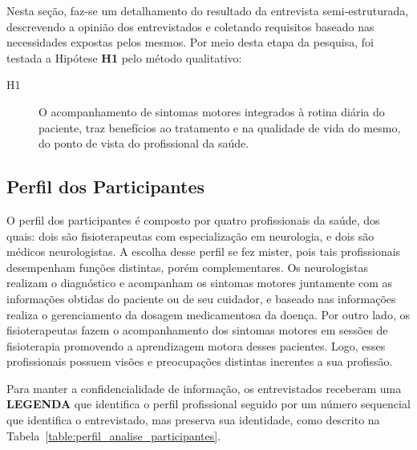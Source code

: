 Nesta seção, faz-se um detalhamento do resultado da entrevista semi-estruturada, descrevendo a opinião dos entrevistados e coletando requisitos baseado nas necessidades expostas pelos mesmos. Por meio desta etapa da pesquisa, foi testada a Hipótese \textbf{H1} pelo método qualitativo:

	\begin{description}
	\item[H1] O acompanhamento de sintomas motores integrados à rotina diária do paciente, traz benefícios ao tratamento e na qualidade de vida do mesmo, do ponto de vista do profissional da saúde.
	\end{description}
	


\subsection{Perfil dos Participantes}
O perfil dos participantes é composto por quatro profissionais da saúde, dos quais: dois são fisioterapeutas com especialização em neurologia, e dois são médicos neurologistas. A escolha desse perfil se fez mister, pois tais profissionais desempenham funções distintas, porém complementares. Os neurologistas realizam o diagnóstico e acompanham os sintomas motores juntamente com as informações obtidas do paciente ou de seu cuidador, e baseado nas informações realiza o gerenciamento da dosagem medicamentosa da doença. Por outro lado, os fisioterapeutas fazem o acompanhamento dos sintomas motores em sessões de fisioterapia promovendo a aprendizagem motora desses pacientes. Logo, esses profissionais possuem visões e preocupações distintas inerentes a sua profissão. 


Para manter a confidencialidade de informação, os entrevistados receberam uma \textbf{LEGENDA} que identifica o perfil profissional seguido por um número sequencial que identifica o entrevistado, mas preserva sua identidade, como descrito na Tabela~\ref{table:perfil_analise_participantes}.

